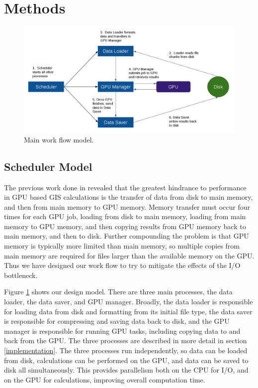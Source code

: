 \documentclass[journal]{IEEEtran}
\begin{document}
\section{Methods} \label{methods}
    \begin{figure}
        \includegraphics[width=\linewidth]{model.png}
        \caption{Main work flow model.}
        \label{model}
    \end{figure}
    \subsection{Scheduler Model}
    The previous work done in \cite{hpc_cuda} revealed that the greatest
    hindrance to performance in GPU based GIS calculations is the transfer of
    data from disk to main memory, and then from main memory to GPU memory.
    Memory transfer must occur four times for each GPU job, loading from disk
    to main memory, loading from main memory to GPU memory, and then copying
    results from GPU memory back to main memory, and then to disk.  Further
    compounding the problem is that GPU memory is typically more limited than
    main memory, so multiple copies from main memory are required for files
    larger than the available memory on the GPU. Thus we have designed our
    work flow to try to mitigate the effects of the I/O bottleneck.

    Figure \ref{model} shows our design model. There are three main processes,
    the data loader, the data saver, and GPU manager. Broadly, the data loader
    is responsible for loading data from disk and formatting from its initial
    file type, the data saver is responsible for compressing and saving data
    back to disk, and the GPU manager is responsible for running GPU tasks,
    including copying data to and back from the GPU. The three processes are
    described in more detail in section \ref{implementation}. The three
    processes run independently, so data can be loaded from disk, calculations
    can be performed on the GPU, and data can be saved to disk all
    simultaneously.  This provides parallelism both on the CPU for I/O, and on
    the GPU for calculations, improving overall computation time.
    
\end{document}
